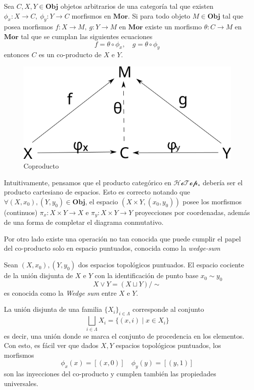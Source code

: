 \begin{definicion}[Coproducto] \label{def:coproducto}
  Sea \(C , X , Y \in \mathbf {Obj}\) objetos arbitrarios de una categoría
  tal que existen \(\phi_x : X \to C,\ \phi_y : Y \to C\) morfismos en
  \(\mathbf {Mor}\). Si para todo objeto \(M \in \mathbf {Obj}\) tal que posea
  morfismos \( f : X \to M,\ g : Y \to M\) en \(\mathbf{Mor}\) existe un
  morfismo \(\theta : C \to M\) en \(\mathbf{Mor}\) tal que se cumplan
  las siguientes ecuaciones
  \[ f = \theta \circ \phi_x, \quad g = \theta \circ \phi_y \]
  entonces \(C\) es un co-producto de \(X\) e \(Y\).
  \begin{figure}[h]
    \centering
    \includegraphics[scale=0.5]{./imagenes/coproducto.png}
    \caption{Coproducto}
  \end{figure}
\end{definicion}
Intuitivamente, pensamos que el producto categórico en
\(\mathscr{HoTop}_*\) debería ser el producto cartesiano de espacios.
Esto es correcto notando que \(\forall (X,x_0) , (Y, y_0) \in \mathbf
{Obj} \), el espacio \((X \times Y, (x_0, y_0))\) posee los morfismos
(continuos) \(\pi_x : X \times Y \to X \) e \(\pi_y : X \times Y \to Y
\) proyecciones por coordenadas, además de una forma de completar el
diagrama conmutativo.

Por otro lado existe una operación no tan conocida que puede cumplir el papel
del co-producto solo en espacio puntuados, conocida como la \emph{wedge-sum}
\begin{definicion}
  Sean \((X, x_0),(Y, y_0)\) dos espacios topológicos puntuados. El
  espacio cociente de la unión disjunta\cite[p.~2]{Martin} de \(X\) e
  \(Y\) con la identificación de punto base \(x_0 \sim y_0\)
  \[ X \vee Y = (X \sqcup Y) / \sim \]
  es conocida como la \emph{Wedge sum} entre \(X\) e \(Y\).
\end{definicion}
La unión disjunta de una familia \(\{X_i\}_{i \in \Lambda}\) corresponde
al conjunto
\[ \bigsqcup_{i \in \Lambda} X_i = \{ (x, i) \mid x \in X_i \} \]
es decir, una unión donde se marca el conjunto de procedencia en los
elementos. Con esto, es fácil ver que dados \(X, Y\) espacios topológicos
puntuados, los morfismos
\[ \phi_x (x) = [(x,0)] \quad \phi_y (y) = [(y,1)] \]
son las inyecciones del co-producto y cumplen también las propiedades
universales.

